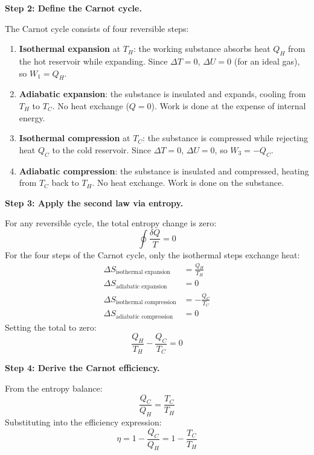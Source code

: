 \documentclass[11pt,openright]{book}
\begin{document}
\textbf{Step 2: Define the Carnot cycle.}

The Carnot cycle consists of four reversible steps:
\begin{enumerate}
\item \textbf{Isothermal expansion} at $T_H$: the working substance absorbs heat $Q_H$ from the hot reservoir while expanding. Since $\Delta T = 0$, $\Delta U = 0$ (for an ideal gas), so $W_1 = Q_H$.
\item \textbf{Adiabatic expansion}: the substance is insulated and expands, cooling from $T_H$ to $T_C$. No heat exchange ($Q = 0$). Work is done at the expense of internal energy.
\item \textbf{Isothermal compression} at $T_C$: the substance is compressed while rejecting heat $Q_C$ to the cold reservoir. Since $\Delta T = 0$, $\Delta U = 0$, so $W_3 = -Q_C$.
\item \textbf{Adiabatic compression}: the substance is insulated and compressed, heating from $T_C$ back to $T_H$. No heat exchange. Work is done on the substance.
\end{enumerate}

\textbf{Step 3: Apply the second law via entropy.}

For any reversible cycle, the total entropy change is zero:
\begin{equation}
\oint \frac{\delta Q}{T} = 0
\end{equation}
For the four steps of the Carnot cycle, only the isothermal steps exchange heat:
\begin{align}
\Delta S_{\text{isothermal expansion}} &= \frac{Q_H}{T_H} \\
\Delta S_{\text{adiabatic expansion}} &= 0 \\
\Delta S_{\text{isothermal compression}} &= -\frac{Q_C}{T_C} \\
\Delta S_{\text{adiabatic compression}} &= 0
\end{align}
Setting the total to zero:
\begin{equation}
\frac{Q_H}{T_H} - \frac{Q_C}{T_C} = 0
\end{equation}

\textbf{Step 4: Derive the Carnot efficiency.}

From the entropy balance:
\begin{equation}
\frac{Q_C}{Q_H} = \frac{T_C}{T_H}
\end{equation}
Substituting into the efficiency expression:
\begin{equation}
\eta = 1 - \frac{Q_C}{Q_H} = 1 - \frac{T_C}{T_H}
\end{equation}
\end{document}
